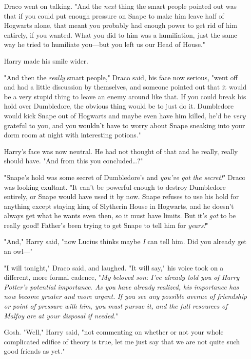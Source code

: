 Draco went on talking. "And the \emph{next} thing the smart people pointed out 
was that if you could put enough pressure on Snape to make him leave half of 
Hogwarts alone, that meant you probably had enough power to get rid of him 
entirely, if you wanted. What you did to him was a humiliation, just the same 
way he tried to humiliate you---but you left us our Head of House."

Harry made his smile wider.

"And then the \emph{really} smart people," Draco said, his face now serious, 
"went off and had a little discussion by themselves, and someone pointed out 
that it would be a very stupid thing to leave an enemy around like that. If you 
could break his hold over Dumbledore, the obvious thing would be to just do it. 
Dumbledore would kick Snape out of Hogwarts and maybe even have him killed, 
he'd be \emph{very} grateful to you, and you wouldn't have to worry about Snape 
sneaking into your dorm room at night with interesting potions."

Harry's face was now neutral. He had not thought of that and he really, really 
should have. "And from this you concluded{\ldots}?"

"Snape's hold was some secret of Dumbledore's and \emph{you've got the 
secret!}" Draco was looking exultant. "It can't be powerful enough to destroy 
Dumbledore entirely, or Snape would have used it by now. Snape refuses to use 
his hold for anything except staying king of Slytherin House in Hogwarts, and 
he doesn't always get what he wants even then, so it must have limits. But it's 
\emph{got} to be really good! Father's been trying to get Snape to tell him for 
\emph{years!}"

"And," Harry said, "now Lucius thinks maybe \emph{I} can tell him. Did you 
already get an owl---"

"I will tonight," Draco said, and laughed. "It will say," his voice took on a 
different, more formal cadence, "\emph{My beloved son: I've already told you of 
Harry Potter's potential importance. As you have already realized, his 
importance has now become greater and more urgent. If you see any possible 
avenue of friendship or point of pressure with him, you must pursue it, and the 
full resources of Malfoy are at your disposal if needed.}"

Gosh. "Well," Harry said, "not commenting on whether or not your whole 
complicated edifice of theory is true, let me just say that we are not quite 
such good friends as yet."

